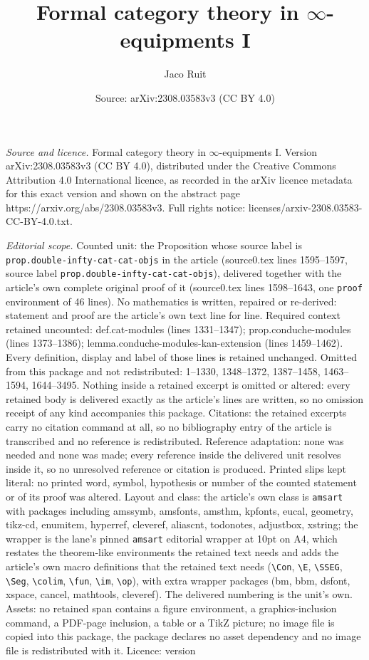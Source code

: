 \documentclass[10pt,a4paper]{amsart}
\title[Formal category theory in $\infty$-equipments I]{Formal category theory in $\infty$-equipments I}
\author{Jaco Ruit}
\date{Source: arXiv:2308.03583v3 (CC BY 4.0)}
\begin{document}
\maketitle

\noindent\emph{Source and licence.} Formal category theory in $\infty$-equipments I. Version arXiv:2308.03583v3 (CC BY 4.0), distributed under the Creative Commons Attribution 4.0 International licence, as recorded in the arXiv licence metadata for this exact version and shown on the abstract page https://arxiv.org/abs/2308.03583v3. Full rights notice: licenses/arxiv-2308.03583-CC-BY-4.0.txt.\par\smallskip

\noindent\textit{Editorial scope.} Counted unit: the Proposition whose source label is \texttt{prop.double-infty-cat-cat-objs} in the article (source0.tex lines 1595--1597, source label \texttt{prop.double-infty-cat-cat-objs}), delivered together with the article's own complete original proof of it (source0.tex lines 1598--1643, one \texttt{proof} environment of 46 lines). No mathematics is written, repaired or re-derived: statement and proof are the article's own text line for line. Required context retained uncounted: def.cat-modules (lines 1331--1347); prop.conduche-modules (lines 1373--1386); lemma.conduche-modules-kan-extension (lines 1459--1462). Every definition, display and label of those lines is retained unchanged. Omitted from this package and not redistributed: 1--1330, 1348--1372, 1387--1458, 1463--1594, 1644--3495. Nothing inside a retained excerpt is omitted or altered: every retained body is delivered exactly as the article's lines are written, so no omission receipt of any kind accompanies this package. Citations: the retained excerpts carry no citation command at all, so no bibliography entry of the article is transcribed and no reference is redistributed. Reference adaptation: none was needed and none was made; every reference inside the delivered unit resolves inside it, so no unresolved reference or citation is produced. Printed slips kept literal: no printed word, symbol, hypothesis or number of the counted statement or of its proof was altered. Layout and class: the article's own class is \texttt{amsart} with packages including amssymb, amsfonts, amsthm, kpfonts, eucal, geometry, tikz-cd, enumitem, hyperref, cleveref, aliascnt, todonotes, adjustbox, xstring; the wrapper is the lane's pinned \texttt{amsart} editorial wrapper at 10pt on A4, which restates the theorem-like environments the retained text needs and adds the article's own macro definitions that the retained text needs (\texttt{\textbackslash Con}, \texttt{\textbackslash E}, \texttt{\textbackslash SSEG}, \texttt{\textbackslash Seg}, \texttt{\textbackslash colim}, \texttt{\textbackslash fun}, \texttt{\textbackslash im}, \texttt{\textbackslash op}), with extra wrapper packages (bm, bbm, dsfont, xspace, cancel, mathtools, cleveref). The delivered numbering is the unit's own. Assets: no retained span contains a figure environment, a graphics-inclusion command, a PDF-page inclusion, a table or a TikZ picture; no image file is copied into this package, the package declares no asset dependency and no image file is redistributed with it. Licence: version 
\end{document}
